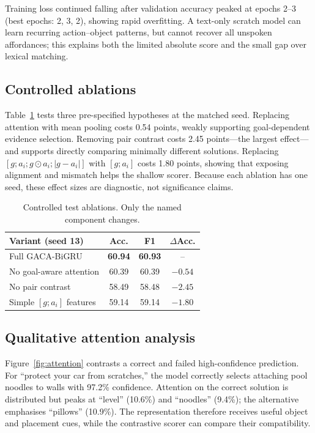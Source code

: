 \documentclass[11pt]{article}
\newcommand{\model}{GACA-BiGRU\xspace}
\begin{document}
Training loss continued falling after validation accuracy peaked at epochs 2--3 (best epochs: 2, 3, 2), showing rapid overfitting. A text-only scratch model can learn recurring action--object patterns, but cannot recover all unspoken affordances; this explains both the limited absolute score and the small gap over lexical matching.

\subsection{Controlled ablations}
Table~\ref{tab:ablation} tests three pre-specified hypotheses at the matched seed. Replacing attention with mean pooling costs 0.54 points, weakly supporting goal-dependent evidence selection. Removing pair contrast costs 2.45 points---the largest effect---and supports directly comparing minimally different solutions. Replacing $[g;a_i;g\odot a_i;|g-a_i|]$ with $[g;a_i]$ costs 1.80 points, showing that exposing alignment and mismatch helps the shallow scorer. Because each ablation has one seed, these effect sizes are diagnostic, not significance claims.

\begin{table}[t]
\centering
\small
\begin{tabular}{lccc}
\toprule
Variant (seed 13) & Acc. & F1 & $\Delta$Acc. \\
\midrule
Full \model & \textbf{60.94} & \textbf{60.93} & -- \\
No goal-aware attention & 60.39 & 60.39 & $-0.54$ \\
No pair contrast & 58.49 & 58.48 & $-2.45$ \\
Simple $[g;a_i]$ features & 59.14 & 59.14 & $-1.80$ \\
\bottomrule
\end{tabular}
\caption{Controlled test ablations. Only the named component changes.}
\label{tab:ablation}
\end{table}

\subsection{Qualitative attention analysis}
Figure~\ref{fig:attention} contrasts a correct and failed high-confidence prediction. For ``protect your car from scratches,'' the model correctly selects attaching pool noodles to walls with 97.2\% confidence. Attention on the correct solution is distributed but peaks at ``level'' (10.6\%) and ``noodles'' (9.4\%); the alternative emphasises ``pillows'' (10.9\%). The representation therefore receives useful object and placement cues, while the contrastive scorer can compare their compatibility.
\end{document}
